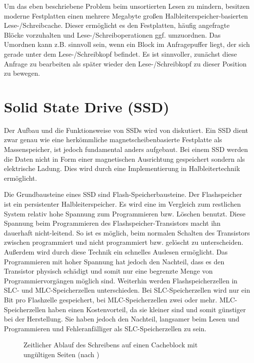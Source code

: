 Um das eben beschriebene Problem beim unsortierten Lesen zu mindern, besitzen moderne Festplatten einen mehrere Megabyte großen Halbleiterspeicher-basierten
Lese-/Schreib\-cache. Dieser ermöglicht es den Festplatten, häufig angefragte Blöcke vorzuhalten und Lese-/Schreiboperationen ggf. umzuordnen. Das Umordnen kann
z.B. sinnvoll sein, wenn ein Block im Anfragepuffer liegt, der sich gerade unter dem Lese-/Schreibkopf befindet. Es ist sinnvoller, zunächst diese
Anfrage zu bearbeiten als später wieder den Lese-/Schreibkopf zu dieser Position zu bewegen.

\section{Solid State Drive (SSD)}
\label{chap2:ssd}

Der Aufbau und die Funktionsweise von \acp{SSD} wird von \textcite{anand1,anand2} diskutiert. Ein \ac{SSD} dient zwar genau wie eine herkömmliche
magnetscheibenbasierte Festplatte als Massenspeicher, ist jedoch fundamental anders aufgebaut. Bei einem \ac{SSD} werden die Daten nicht in Form einer
magnetischen Ausrichtung gespeichert sondern als elektrische Ladung. Dies wird durch eine Implementierung in Halbleitertechnik ermöglicht.

Die Grundbausteine eines \ac{SSD} sind Flash-Speicherbausteine. Der Flashspeicher ist ein persistenter Halbleiterspeicher. Es wird eine im Vergleich zum
restlichen System relativ hohe Spannung zum Programmieren bzw. Löschen benutzt. Diese Spannung beim Programmieren des Flashspeicher-Transistors macht ihn
dauerhaft nicht-leitend. So ist es möglich, beim normalen Schalten des Transistors zwischen programmiert und nicht programmiert bzw. gelöscht zu unterscheiden.
Außerdem wird durch diese Technik ein schnelles Auslesen ermöglicht. Das Programmieren mit hoher Spannung hat jedoch den Nachteil, dass es den Transistor
physisch schädigt und somit nur eine begrenzte Menge von Programmiervorgängen möglich sind. Weiterhin werden Flashspeicherzellen in \ac{SLC}- und
\ac{MLC}-Speicherzellen unterschieden. Bei \ac{SLC}-Speicherzellen wird nur ein Bit pro Flashzelle gespeichert, bei \ac{MLC}-Speicherzellen zwei oder mehr.
\ac{MLC}-Speicherzellen haben einen Kostenvorteil, da sie kleiner sind und somit günstiger bei der Herstellung. Sie haben jedoch den Nachteil, langsamer beim
Lesen und Programmieren und Fehleranfälliger als \ac{SLC}-Speicherzellen zu sein.

\begin{figure}[b!]\centering
  \vspace{0.5cm}
	\caption[Zeitlicher Ablauf des Schreibens auf einen Cacheblock mit ungültigen Seiten]{Zeitlicher Ablauf des Schreibens auf einen Cacheblock mit ungültigen Seiten (nach \textcite{anand1})}
	\label{img:ssd1}
\end{figure}

